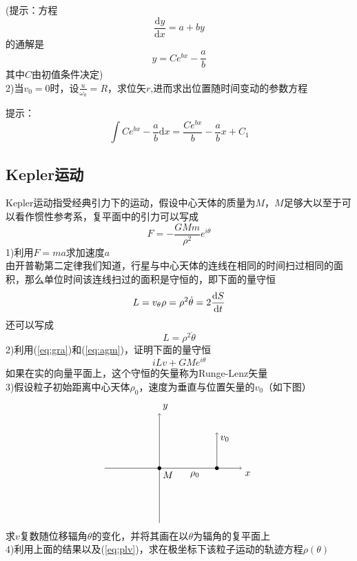 \documentclass[UTF8]{ctexart}
\newcommand{\D}{\mathrm{d}}
\begin{document}
(提示：方程
\[\frac{\D y}{\D x } = a+by\]
的通解是
\[y = Ce^{bx}-\frac{a}{b}\]
其中$C$由初值条件决定)\\
2)当$v_0 = 0$时，设$\frac{u}{\omega_0} = R$，求位矢$r$,进而求出位置随时间变动的参数方程

提示：
\[\int Ce^{bx}-\frac{a}{b} \D x = \frac{Ce^{bx}}{b}-\frac{a}{b}x + C_1\]
\subsection{Kepler运动}
Kepler运动指受经典引力下的运动，假设中心天体的质量为$M$，$M$足够大以至于可以看作惯性参考系，复平面中的引力可以写成
\begin{equation}
    F= -\frac{GMm}{\rho^2}e^{i\theta} \label{eq:gra}
\end{equation}
1)利用$F=ma$求加速度$a$\\
由开普勒第二定律我们知道，行星与中心天体的连线在相同的时间扫过相同的面积，那么单位时间该连线扫过的面积是守恒的，即下面的量守恒
\[L = v_{\theta}\rho = {\rho^2 \dot{\theta}} = 2{\D S \over \D t}\]
还可以写成
\begin{equation}
    L = \rho^2 \dot{\theta}\label{eq:agm}
\end{equation}
2)利用(\ref{eq:gra})和(\ref{eq:agm})，证明下面的量守恒
\[iLv+GMe^{i\theta}\]
如果在实的向量平面上，这个守恒的矢量称为Runge-Lenz矢量\\
3)假设粒子初始距离中心天体$\rho_0$，速度为垂直与位置矢量的$v_0$（如下图）
\[
\begin{tikzpicture}
    \draw[->] (0,-2) -- (0,2);
    \draw[->] (-2,0) -- (3,0);
    \node[below right] (B) at (3,0) {$x$};
    \node[above right] (C) at (0,2) {$y$};
    \node[below right] (O) at (0,0) {$M$};
    \fill (0,0) circle (2pt);
    \fill (2.1,0) circle (2pt);
    \draw[->] (2.1,0) -- (2.1,1.3);
    \node[below right] (B) at (2.1,1.3) {$v_0$};
    \node[below right] (B) at (1,0) {$\rho_0$};
\end{tikzpicture}
\]
求$v$复数随位移辐角$\theta$的变化，并将其画在以$\theta$为辐角的复平面上\\
4)利用上面的结果以及(\ref{eq:plv})，求在极坐标下该粒子运动的轨迹方程$\rho(\theta)$
\end{document}

